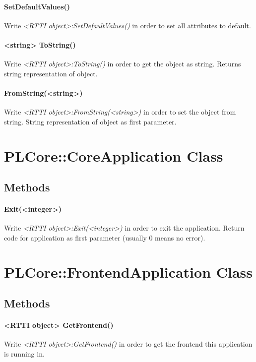 \paragraph{SetDefaultValues()}
Write \emph{<RTTI object>:SetDefaultValues()} in order to set all attributes to default.

\paragraph{<string> ToString()}
Write \emph{<RTTI object>:ToString()} in order to get the object as string. Returns string representation of object.

\paragraph{FromString(<string>)}
Write \emph{<RTTI object>:FromString(<string>)} in order to set the object from string. String representation of object as first parameter.




\section{PLCore::CoreApplication Class}


\subsection{Methods}

\paragraph{Exit(<integer>)}
Write \emph{<RTTI object>:Exit(<integer>)} in order to exit the application. Return code for application as first parameter (usually 0 means no error).




\section{PLCore::FrontendApplication Class}


\subsection{Methods}

\paragraph{<RTTI object> GetFrontend()}
Write \emph{<RTTI object>:GetFrontend()} in order to get the frontend this application is running in.




